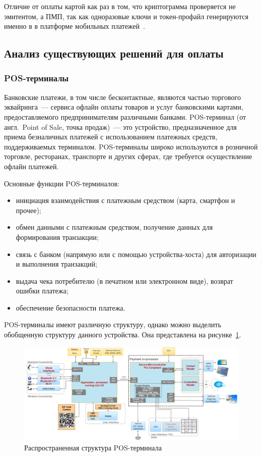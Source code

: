 Отличие от оплаты картой как раз в том, что криптограмма проверяется не эмитентом, а ПМП, так как одноразовые ключи и токен-профайл генерируются именно в в платформе мобильных платежей~\cite{habr_nspk_mir_payment}.



\subsection{Анализ существующих решений для оплаты}

\subsubsection{POS-терминалы}

Банковские платежи, в том числе бесконтактные, являются частью торгового эквайринга~--- сервиса офлайн оплаты товаров и услуг банковскими картами, предоставляемого предпринимателям различными банками.
POS-терминал (от англ.\ Point of Sale, точка продаж)~--- это устройство, предназначенное для приема безналичных платежей с использованием платежных средств, поддерживаемых терминалом.
POS-терминалы широко используются в розничной торговле, ресторанах, транспорте и других сферах, где требуется осуществление офлайн платежей.

Основные функции POS-терминалов:

\begin{itemize}
    \item инициация взаимодействия с платежным средством (карта, смартфон и прочее);
    \item обмен данными с платежным средством, получение данных для формирования транзакции;
    \item связь с банком (напрямую или с помощью устройства-хоста) для авторизации и выполнения транзакций;
    \item выдача чека потребителю (в печатном или электронном виде), возврат ошибки платежа;
    \item обеспечение безопасности платежа.
\end{itemize}

POS-терминалы имеют различную структуру, однако можно выделить обобщенную структуру данного устройства.
Она представлена на рисунке~\ref{fig:postrem_struct}.

\begin{figure}[H]
    \centering
    \includegraphics[width=1\textwidth]{images/research/postrem_struct}
    \caption{\centering Распространенная структура POS-терминала}
    \label{fig:postrem_struct}
\end{figure}

